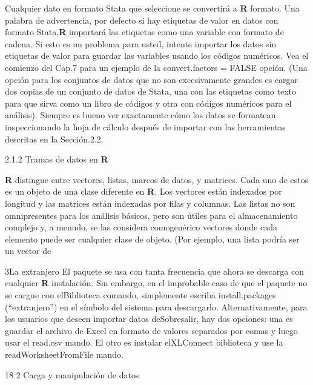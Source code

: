 \documentclass[
]{book}
\begin{document}
Cualquier dato en formato Stata que seleccione se convertirá a \textbf{R} formato. Una palabra de advertencia, por defecto si hay etiquetas de valor en datos con formato Stata,\textbf{R} importará las etiquetas como una variable con formato de cadena. Si esto es un problema para usted, intente importar los datos sin etiquetas de valor para guardar las variables usando los códigos numéricos. Vea el comienzo del Cap.7 para un ejemplo de la convert.factors = FALSE opción. (Una opción para los conjuntos de datos que no son excesivamente grandes es cargar dos copias de un conjunto de datos de Stata, una con las etiquetas como texto para que sirva como un libro de códigos y otra con códigos numéricos para el análisis). Siempre es bueno ver exactamente cómo los datos se formatean inspeccionando la hoja de cálculo después de importar con las herramientas descritas en la Sección.2.2.

2.1.2 Tramas de datos en \textbf{R}

\textbf{R} distingue entre vectores, listas, marcos de datos, y matrices. Cada uno de estos es un objeto de una clase diferente en \textbf{R}. Los vectores están indexados por longitud y las matrices están indexadas por filas y columnas. Las listas no son omnipresentes para los análisis básicos, pero son útiles para el almacenamiento complejo y, a menudo, se las considera comogenérico vectores donde cada elemento puede ser cualquier clase de objeto. (Por ejemplo, una lista podría ser un vector de

3La extranjero El paquete se usa con tanta frecuencia que ahora se descarga con cualquier \textbf{R} instalación. Sin embargo, en el improbable caso de que el paquete no se cargue con elBiblioteca comando, simplemente escriba install.packages (``extranjero'') en el símbolo del sistema para descargarlo. Alternativamente, para los usuarios que deseen importar datos deSobresalir, hay dos opciones: una es guardar el archivo de Excel en formato de valores separados por comas y luego usar el read.csv mando. El otro es instalar elXLConnect biblioteca y use la readWorksheetFromFile mando.

18 2 Carga y manipulación de datos
\end{document}
